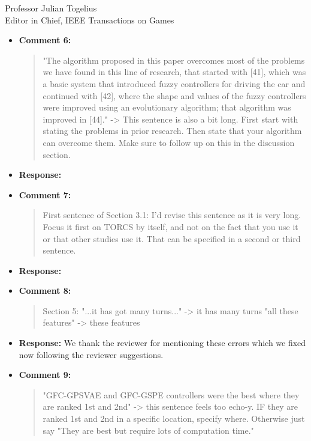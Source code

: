 \documentclass[10pt]{letter} %
\begin{document}
\begin{letter}{Professor Julian Togelius \\ Editor in Chief, IEEE Transactions on Games}
\begin{enumerate}
\begin{itemize}
				\textcolor{red}{
					If we can eliminate fitness, we can remove a source of uncertainty. We accomplish this by substituting a single (and uncertain) fitness  by a podium (a ranking after several races against other opponents) in which car controllers that win the most races will proceed to the next generation, while those that do not, will simply be removed from the pool. We can further reduce uncertainty even more by repeating races several times."
				}
		\item {\bf Comment 6:}
			\begin{quote}
				"The algorithm proposed in this paper overcomes most of the problems we have found in this line of research, that started with [41], which was a basic system that introduced fuzzy controllers for driving the car and continued with [42], where the shape and values of the fuzzy controllers were improved using an evolutionary algorithm; that algorithm
				was improved in [44]." -> This sentence is also a bit long. First start with stating the problems in prior research. Then state that your algorithm can overcome them. Make sure to follow up on this in the discussion section.
			\end{quote}	
		\item {\bf Response:} 
		\item {\bf Comment 7:}
			\begin{quote}
				First sentence of Section 3.1: I'd revise this sentence as it is very long. Focus it first on TORCS by itself, and not on the fact that you use it or that other studies use it. That can be specified in a second or third sentence.
			\end{quote}	
		\item {\bf Response:} 
		\item {\bf Comment 8:}
			\begin{quote}
				Section 5:
				"...it has got many turns..." -> it has many turns
				"all these features" -> these features
			\end{quote}	
		\item {\bf Response:} 
			We thank the reviewer for mentioning these errors which we fixed now following the reviewer suggestions.
		\item {\bf Comment 9:}
			\begin{quote}
				"GFC-GPSVAE and GFC-GSPE controllers were the best where they are ranked 1st and 2nd" -> this sentence feels too echo-y. IF they are ranked 1st and 2nd in a specific location, specify where. Otherwise just say "They are best but require lots of computation time."

\end{quote}
\end{itemize}
\end{enumerate}
\end{letter}
\end{document}
